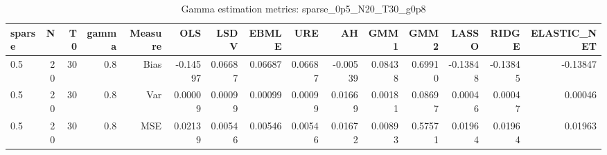 \begin{table}[!htbp]\centering
\caption{Gamma estimation metrics: sparse_0p5_N20_T30_g0p8}
\label{tab:table1_sparse_0p5_N20_T30_g0p8}
\begin{tabular}{lrrrrrrrrrrrrrr}
\hline
sparse & N & T0 & gamma & Measure & OLS & LSDV & EBMLE & URE & AH & GMM1 & GMM2 & LASSO & RIDGE & ELASTIC_NET \\
\hline
0.5 & 20 & 30 & 0.8 & Bias & -0.14597 & 0.06687 & 0.06687 & 0.06687 & -0.00539 & 0.08438 & 0.69910 & -0.13848 & -0.13845 & -0.13847 \\
0.5 & 20 & 30 & 0.8 & Var & 0.00009 & 0.00099 & 0.00099 & 0.00099 & 0.01669 & 0.00181 & 0.08697 & 0.00046 & 0.00047 & 0.00046 \\
0.5 & 20 & 30 & 0.8 & MSE & 0.02139 & 0.00546 & 0.00546 & 0.00546 & 0.01672 & 0.00893 & 0.57571 & 0.01964 & 0.01964 & 0.01963 \\
\hline
\end{tabular}
\end{table}


